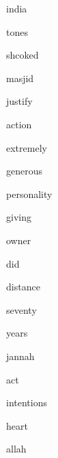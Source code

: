 \documentclass[varwidth]{standalone}
\begin{document}
\begin{CJK*}{UTF8}{gbsn}
{{{\colorbox{red!8.333104133605957}{\strut india}
\colorbox{red!4.478368759155273}{\strut tones}
\colorbox{red!6.5400710105896}{\strut shcoked}
\colorbox{red!10.627734184265137}{\strut masjid}
\colorbox{red!4.753153324127197}{\strut justify}
\colorbox{red!2.5747451782226562}{\strut action}
\colorbox{red!5.15687894821167}{\strut extremely}
\colorbox{red!4.386747360229492}{\strut generous}
\colorbox{red!2.689945697784424}{\strut personality}
\colorbox{red!3.88948917388916}{\strut giving}
\colorbox{red!3.77217960357666}{\strut owner}
\colorbox{red!10.36172866821289}{\strut did}
\colorbox{red!2.6232261657714844}{\strut distance}
\colorbox{red!4.7366943359375}{\strut seventy}
\colorbox{red!3.15926456451416}{\strut years}
\colorbox{red!6.466012477874756}{\strut jannah}
\colorbox{red!4.039475440979004}{\strut act}
\colorbox{red!3.0649571418762207}{\strut intentions}
\colorbox{red!10.0648775100708}{\strut heart}
\colorbox{red!5.125884056091309}{\strut allah}

}}}
\end{CJK*}
\end{document}
